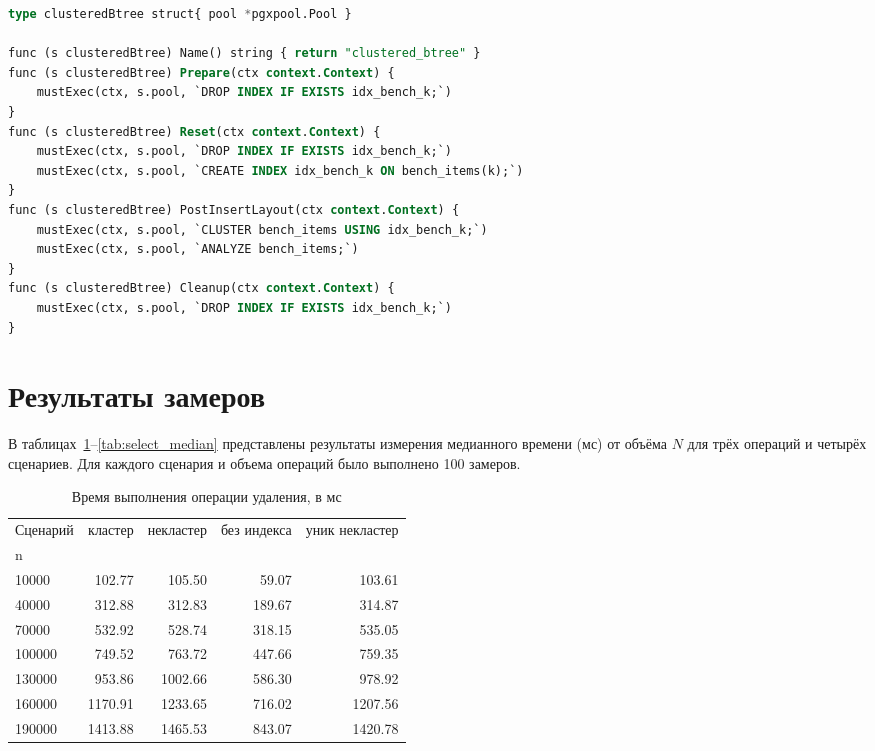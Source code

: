 \begin{lstlisting}[language=SQL,caption={Сценарий с укладкой CLUSTER по k},label={lst:cluster}]
type clusteredBtree struct{ pool *pgxpool.Pool }

func (s clusteredBtree) Name() string { return "clustered_btree" }
func (s clusteredBtree) Prepare(ctx context.Context) {
    mustExec(ctx, s.pool, `DROP INDEX IF EXISTS idx_bench_k;`)
}
func (s clusteredBtree) Reset(ctx context.Context) {
    mustExec(ctx, s.pool, `DROP INDEX IF EXISTS idx_bench_k;`)
    mustExec(ctx, s.pool, `CREATE INDEX idx_bench_k ON bench_items(k);`)
}
func (s clusteredBtree) PostInsertLayout(ctx context.Context) {
    mustExec(ctx, s.pool, `CLUSTER bench_items USING idx_bench_k;`)
    mustExec(ctx, s.pool, `ANALYZE bench_items;`)
}
func (s clusteredBtree) Cleanup(ctx context.Context) {
    mustExec(ctx, s.pool, `DROP INDEX IF EXISTS idx_bench_k;`)
}
\end{lstlisting}

\clearpage
\section{Результаты замеров}

В таблицах~\ref{tab:delete_median}--\ref{tab:select_median} представлены результаты измерения медианного времени (мс) от объёма \(N\)
для трёх операций и четырёх сценариев. Для каждого сценария и объема операций было выполнено 100 замеров.

\begin{table}[H]
\caption{Время выполнения операции удаления, в мс}
\label{tab:delete_median}
\begin{tabular}{|l|r|r|r|r|}
    \hline
Сценарий & кластер & некластер & без индекса & уник некластер\\
n &  &  &  &  \\
\hline
10000 & 102.77 & 105.50 & 59.07 & 103.61 \\
\hline
40000 & 312.88 & 312.83 & 189.67 & 314.87 \\
\hline
70000 & 532.92 & 528.74 & 318.15 & 535.05 \\
\hline
100000 & 749.52 & 763.72 & 447.66 & 759.35 \\
\hline
130000 & 953.86 & 1002.66 & 586.30 & 978.92 \\
\hline
160000 & 1170.91 & 1233.65 & 716.02 & 1207.56 \\
\hline
190000 & 1413.88 & 1465.53 & 843.07 & 1420.78 \\
\hline
\end{tabular}
\end{table}


